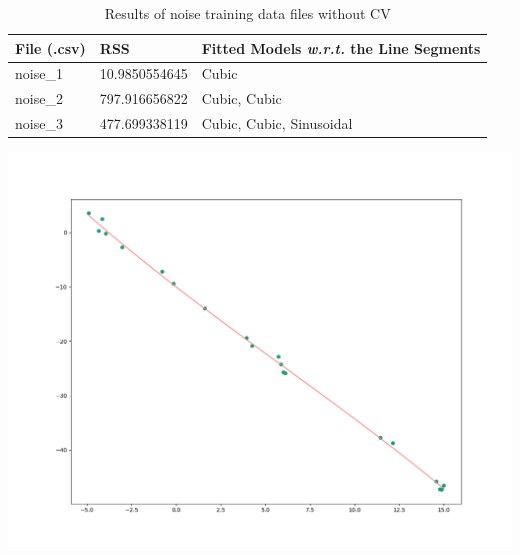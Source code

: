 \documentclass[a4paper,11pt]{article}
\begin{document}
\begin{table}[ht!]
    \begin{minipage}{0.5\linewidth}
    \scriptsize
    \centering
    \caption{Results of noise training data files without CV}
    \label{tab:noise_no_cv_results}
    \begin{tabular}{l l l}
        \toprule
        File (.csv) & RSS & Fitted Models \textit{w.r.t.} the Line Segments \\
        \midrule
        noise\_1
            & \num{10.9850554645}
            & Cubic
        \\
        noise\_2
            & \num{797.916656822}
            & Cubic, Cubic
        \\
        noise\_3
            & \num{477.699338119}
            & Cubic, Cubic, Sinusoidal
        \\
        \bottomrule
    \end{tabular}
    \end{minipage}
    \begin{minipage}{0.5\linewidth}
    \centering
    \includegraphics[width=1\linewidth]{res/noise_1_no_cv.png}
    \label{fig:noise_1_no_cv}
    \end{minipage}
\end{table}
\FloatBarrier
\end{document}
